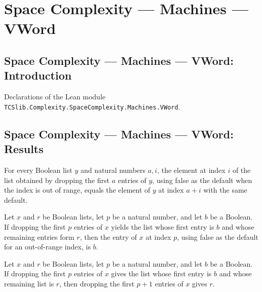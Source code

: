 \section{Space Complexity --- Machines --- VWord}
\subsection*{Space Complexity --- Machines --- VWord: Introduction}

Declarations of the Lean module \texttt{TCSlib.Complexity.SpaceComplexity.Machines.VWord}.

\subsection*{Space Complexity --- Machines --- VWord: Results}

\begin{lemma}
\label{Complexity.getD_drop}
\leanok
{}
For every Boolean list $y$ and natural numbers $a,i$, the element at index $i$ of the
list obtained by dropping the first $a$ entries of $y$, using false as the default when
the index is out of range, equals the element of $y$ at index $a+i$ with the same
default.
\end{lemma}

\begin{lemma}
\label{Complexity.getD_of_drop}
\leanok
{}
Let $x$ and $r$ be Boolean lists, let $p$ be a natural number, and let $b$ be a Boolean.
If dropping the first $p$ entries of $x$ yields the list whose first entry is $b$ and
whose remaining entries form $r$, then the entry of $x$ at index $p$, using false as the
default for an out-of-range index, is $b$.
\end{lemma}

\begin{lemma}
\label{Complexity.drop_succ_of_drop}
\leanok
{}
Let $x$ and $r$ be Boolean lists, let $p$ be a natural number, and let $b$ be a Boolean.
If dropping the first $p$ entries of $x$ gives the list whose first entry is $b$ and
whose remaining list is $r$, then dropping the first $p+1$ entries of $x$ gives $r$.
\end{lemma}

